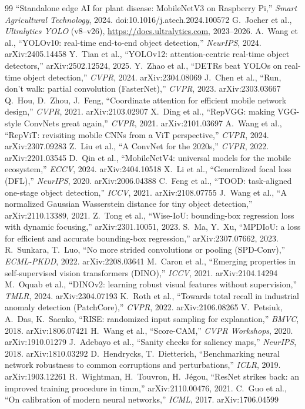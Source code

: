 \begin{thebibliography}{99}
 ``Standalone edge AI for plant disease: MobileNetV3 on Raspberry Pi,'' \emph{Smart Agricultural Technology}, 2024. doi:10.1016/j.atech.2024.100572
 G.~Jocher et al., \emph{Ultralytics YOLO} (v8--v26), \url{https://docs.ultralytics.com}, 2023--2026.
 A.~Wang et al., ``YOLOv10: real-time end-to-end object detection,'' \emph{NeurIPS}, 2024. arXiv:2405.14458
 Y.~Tian et al., ``YOLOv12: attention-centric real-time object detectors,'' arXiv:2502.12524, 2025.
 Y.~Zhao et al., ``DETRs beat YOLOs on real-time object detection,'' \emph{CVPR}, 2024. arXiv:2304.08069
 J.~Chen et al., ``Run, don't walk: partial convolution (FasterNet),'' \emph{CVPR}, 2023. arXiv:2303.03667
 Q.~Hou, D.~Zhou, J.~Feng, ``Coordinate attention for efficient mobile network design,'' \emph{CVPR}, 2021. arXiv:2103.02907
 X.~Ding et al., ``RepVGG: making VGG-style ConvNets great again,'' \emph{CVPR}, 2021. arXiv:2101.03697
 A.~Wang et al., ``RepViT: revisiting mobile CNNs from a ViT perspective,'' \emph{CVPR}, 2024. arXiv:2307.09283
 Z.~Liu et al., ``A ConvNet for the 2020s,'' \emph{CVPR}, 2022. arXiv:2201.03545
 D.~Qin et al., ``MobileNetV4: universal models for the mobile ecosystem,'' \emph{ECCV}, 2024. arXiv:2404.10518
 X.~Li et al., ``Generalized focal loss (DFL),'' \emph{NeurIPS}, 2020. arXiv:2006.04388
 C.~Feng et al., ``TOOD: task-aligned one-stage object detection,'' \emph{ICCV}, 2021. arXiv:2108.07755
 J.~Wang et al., ``A normalized Gaussian Wasserstein distance for tiny object detection,'' arXiv:2110.13389, 2021.
 Z.~Tong et al., ``Wise-IoU: bounding-box regression loss with dynamic focusing,'' arXiv:2301.10051, 2023.
 S.~Ma, Y.~Xu, ``MPDIoU: a loss for efficient and accurate bounding-box regression,'' arXiv:2307.07662, 2023.
 R.~Sunkara, T.~Luo, ``No more strided convolutions or pooling (SPD-Conv),'' \emph{ECML-PKDD}, 2022. arXiv:2208.03641
 M.~Caron et al., ``Emerging properties in self-supervised vision transformers (DINO),'' \emph{ICCV}, 2021. arXiv:2104.14294
 M.~Oquab et al., ``DINOv2: learning robust visual features without supervision,'' \emph{TMLR}, 2024. arXiv:2304.07193
 K.~Roth et al., ``Towards total recall in industrial anomaly detection (PatchCore),'' \emph{CVPR}, 2022. arXiv:2106.08265
 V.~Petsiuk, A.~Das, K.~Saenko, ``RISE: randomized input sampling for explanation,'' \emph{BMVC}, 2018. arXiv:1806.07421
 H.~Wang et al., ``Score-CAM,'' \emph{CVPR Workshops}, 2020. arXiv:1910.01279
 J.~Adebayo et al., ``Sanity checks for saliency maps,'' \emph{NeurIPS}, 2018. arXiv:1810.03292
 D.~Hendrycks, T.~Dietterich, ``Benchmarking neural network robustness to common corruptions and perturbations,'' \emph{ICLR}, 2019. arXiv:1903.12261
 R.~Wightman, H.~Touvron, H.~J\'egou, ``ResNet strikes back: an improved training procedure in timm,'' arXiv:2110.00476, 2021.
 C.~Guo et al., ``On calibration of modern neural networks,'' \emph{ICML}, 2017. arXiv:1706.04599
\end{thebibliography}
